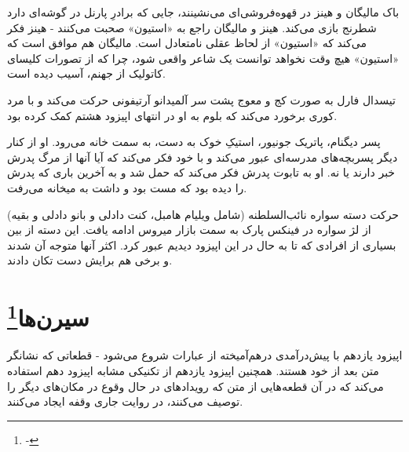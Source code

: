 \documentclass[12pt]{book}
\newcommand{\noun}[1]{«{#1}»}
\begin{document}
    باک مالیگان و هینز در قهوه‌فروشی‌ای می‌نشینند، جایی که برادرِ پارنل در گوشه‌ای دارد شطرنج بازی می‌کند. هینز و مالیگان راجع به \noun{استیون} صحبت می‌کنند - هینز فکر می‌کند که \noun{استیون} از لحاظ عقلی نامتعادل است. مالیگان هم موافق است که \noun{استیون} هیچ وقت نخواهد توانست یک شاعر واقعی شود، چرا که از تصورات کلیسای کاتولیک از جهنم، آسیب دیده است.

    تیسدال فارل به صورت کج و معوج پشت سر آلمیدانو آرتیفونی حرکت می‌کند و با مرد کوری برخورد می‌کند که بلوم به او در انتهای اپیزود هشتم کمک کرده بود.

    پسر دیگنام، پاتریک جونیور، استیکِ خوک به دست، به سمت خانه می‌رود. او از کنار دیگر پسربچه‌های مدرسه‌ای عبور می‌کند و با خود فکر می‌کند که آیا آنها از مرگ پدرش خبر دارند یا نه. او به تابوت پدرش فکر می‌کند که حمل شد و به آخرین باری که پدرش را دیده بود که مست بود و داشت به میخانه می‌رفت.

    حرکت دسته سواره نائب‌السلطنه (شامل ویلیام هامبل، کنت دادلی و بانو دادلی و بقیه) از لژ سواره در فینکس پارک به سمت بازار میروس ادامه یافت. این دسته از بین بسیاری از افرادی که تا به حال در این اپیزود دیدیم عبور کرد. اکثر آنها متوجه آن شدند و برخی هم برایش دست تکان دادند.

    \chapter[سیرن‌ها]{سیرن‌ها\protect\footnote{-}}\label{ep:11}
    اپیزود یازدهم با پیش‌درآمدی درهم‌آمیخته از عبارات شروع می‌شود - قطعاتی که نشانگر متن بعد از خود هستند. همچنین اپیزود یازدهم از تکنیکی مشابه اپیزود دهم استفاده می‌کند که در آن قطعه‌هایی از متن که رویدادهای در حال وقوع در مکان‌های دیگر را توصیف می‌کنند، در روایت جاری وقفه ایجاد می‌کنند.
\end{document}
